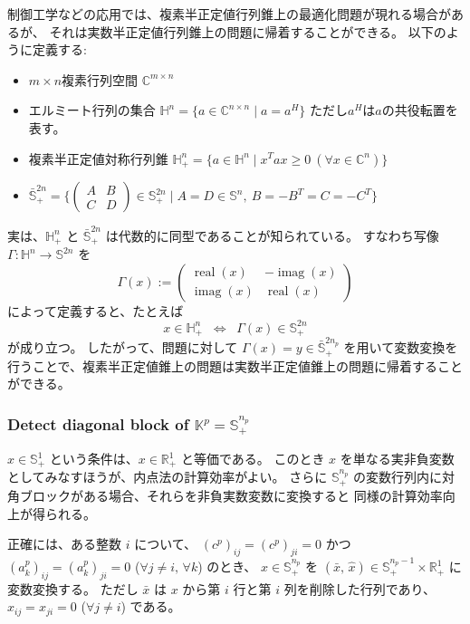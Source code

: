 \documentclass{jsarticle}
\begin{document}
制御工学などの応用では、複素半正定値行列錐上の最適化問題が現れる場合があるが、
それは実数半正定値行列錐上の問題に帰着することができる。
以下のように定義する:
\begin{itemize}
    \item $m\times n$複素行列空間 $\mathbb{C}^{m\times n}$
    \item エルミート行列の集合 $\mathbb{H}^n=\{a \in \mathbb{C}^{n\times n} \mid a = a^H\}$ ただし$a^H$は$a$の共役転置を表す。
    \item 複素半正定値対称行列錐 $\mathbb{H}^n_+=\{a \in \mathbb{H}^n \mid x^T a x \geq 0 ~(\forall x\in \mathbb{C}^n)\}$
    \item $\bar{\mathbb{S}}^{2n}_+ = \{(\begin{smallmatrix}
    A & B\\
    C & D
\end{smallmatrix}) \in \mathbb{S}^{2n}_+ \mid A=D\in \mathbb{S}^n, ~ B=-B^T=C=-C^T\}$
\end{itemize}
実は、$\mathbb{H}^n_+$ と $\bar{\mathbb{S}}^{2n}_+$ は代数的に同型であることが知られている。
すなわち写像 $\Gamma: \mathbb{H}^n\to \mathbb{S}^{2n}$ を
\[
  \Gamma(x)
  := \begin{pmatrix}
       \operatorname{real}(x) & -\operatorname{imag}(x) \\
       \operatorname{imag}(x) & \operatorname{real}(x)
     \end{pmatrix}
\]
によって定義すると、たとえば
\[
  x\in \mathbb{H}^n_+
   \;\;\Longleftrightarrow\;\;
  \Gamma(x)\in \mathbb{S}^{2n}_+
\]
が成り立つ。
したがって、問題に対して $\Gamma(x)= y \in \bar{\mathbb{S}}^{2n_p}_+$ を用いて変数変換を行うことで、複素半正定値錐上の問題は実数半正定値錐上の問題に帰着することができる。


\subsubsection{Detect diagonal block of $\mathbb{K}^p=\mathbb{S}^{n_p}_+$}

$x\in \mathbb{S}^1_+$ という条件は、$x\in \mathbb{R}^1_+$ と等価である。  
このとき $x$ を単なる実非負変数としてみなすほうが、内点法の計算効率がよい。  
さらに $\mathbb{S}^{n_p}_+$ の変数行列内に対角ブロックがある場合、それらを非負実数変数に変換すると
同様の計算効率向上が得られる。

正確には、ある整数 $i$ について、
$(c^p)_{ij}=(c^p)_{ji}=0$ かつ $(a^p_k)_{ij}=(a^p_k)_{ji}=0$ 
($\forall j\neq i,\,\forall k$) のとき、
$x\in \mathbb{S}^{n_p}_+$ を $(\bar{x},\,\hat{x})\in \mathbb{S}^{n_p-1}_+\times \mathbb{R}^1_+$ に変数変換する。
ただし $\bar{x}$ は $x$ から第 $i$ 行と第 $i$ 列を削除した行列であり、
$x_{ij}= x_{ji}=0$ ($\forall j\neq i$) である。
\end{document}
